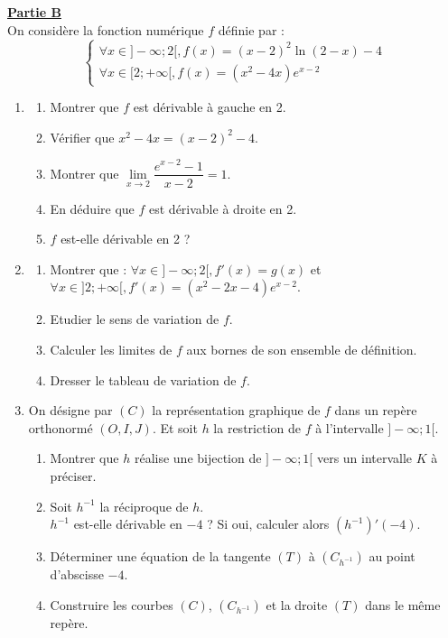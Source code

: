 \documentclass[12pt,a4paper]{article}
\begin{document}
\vspace{0.5cm}

\noindent \underline{\textbf{Partie B}} \\
On considère la fonction numérique $f$ définie par :
\[ \begin{cases} \forall x \in ]-\infty; 2[, f(x) = (x - 2)^2 \ln(2 - x) - 4 \\ \forall x \in [2; +\infty[, f(x) = (x^2 - 4x)e^{x-2} \end{cases} \]
\begin{enumerate}
    \item 
    \begin{enumerate}
        \item Montrer que $f$ est dérivable à gauche en 2.
        \item Vérifier que $x^2 - 4x = (x - 2)^2 - 4$.
        \item Montrer que $\lim\limits_{x \to 2} \dfrac{e^{x-2} - 1}{x - 2} = 1$.
        \item En déduire que $f$ est dérivable à droite en 2.
        \item $f$ est-elle dérivable en 2 ?
    \end{enumerate}
    \item 
    \begin{enumerate}
        \item Montrer que : $\forall x \in ]-\infty; 2[, f'(x) = g(x)$ et $\forall x \in ]2; +\infty[, f'(x) = (x^2 - 2x - 4)e^{x-2}$.
        \item Etudier le sens de variation de $f$.
        \item Calculer les limites de $f$ aux bornes de son ensemble de définition.
        \item Dresser le tableau de variation de $f$.
    \end{enumerate}
    \item On désigne par $(C)$ la représentation graphique de $f$ dans un repère orthonormé $(O, I, J)$. Et soit $h$ la restriction de $f$ à l'intervalle $]-\infty; 1[$.
    \begin{enumerate}
        \item Montrer que $h$ réalise une bijection de $]-\infty; 1[$ vers un intervalle $K$ à préciser.
        \item Soit $h^{-1}$ la réciproque de $h$. \\
        $h^{-1}$ est-elle dérivable en $-4$ ? Si oui, calculer alors $(h^{-1})'(-4)$.
        \item Déterminer une équation de la tangente $(T)$ à $(C_{h^{-1}})$ au point d'abscisse $-4$.
        \item Construire les courbes $(C)$, $(C_{h^{-1}})$ et la droite $(T)$ dans le même repère.
    \end{enumerate}
\end{enumerate}
\end{document}

